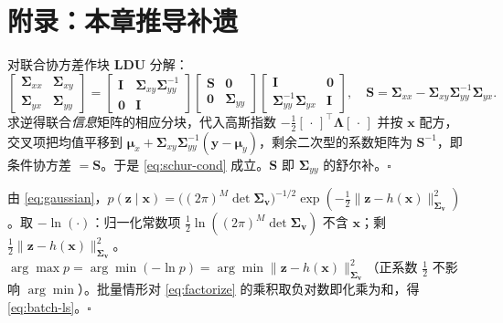\section*{附录：本章推导补遗}
\label{sec:est-appendix}

\begin{derivation}
对联合协方差作块 $\mathbf{LDU}$ 分解：
\[
  \begin{bmatrix}\boldsymbol{\Sigma}_{xx}&\boldsymbol{\Sigma}_{xy}\\\boldsymbol{\Sigma}_{yx}&\boldsymbol{\Sigma}_{yy}\end{bmatrix}
  =\begin{bmatrix}\mathbf{I}&\boldsymbol{\Sigma}_{xy}\boldsymbol{\Sigma}_{yy}^{-1}\\\mathbf{0}&\mathbf{I}\end{bmatrix}
   \begin{bmatrix}\mathbf{S}&\mathbf{0}\\\mathbf{0}&\boldsymbol{\Sigma}_{yy}\end{bmatrix}
   \begin{bmatrix}\mathbf{I}&\mathbf{0}\\\boldsymbol{\Sigma}_{yy}^{-1}\boldsymbol{\Sigma}_{yx}&\mathbf{I}\end{bmatrix},
  \quad \mathbf{S}=\boldsymbol{\Sigma}_{xx}-\boldsymbol{\Sigma}_{xy}\boldsymbol{\Sigma}_{yy}^{-1}\boldsymbol{\Sigma}_{yx}.
\]
求逆得联合\emph{信息}矩阵的相应分块，代入高斯指数 $-\tfrac12[\,\cdot\,]^\top\boldsymbol{\Lambda}[\,\cdot\,]$ 并按 $\mathbf{x}$ 配方，交叉项把均值平移到 $\boldsymbol{\mu}_x+\boldsymbol{\Sigma}_{xy}\boldsymbol{\Sigma}_{yy}^{-1}(\mathbf{y}-\boldsymbol{\mu}_y)$，剩余二次型的系数矩阵为 $\mathbf{S}^{-1}$，即条件协方差 $=\mathbf{S}$。于是 \cref{eq:schur-cond} 成立。$\mathbf{S}$ 即 $\boldsymbol{\Sigma}_{yy}$ 的舒尔补。\hfill$\square$
\end{derivation}

\begin{derivation}
由 \cref{eq:gaussian}，$p(\mathbf{z}\mid\mathbf{x})=\big((2\pi)^M\det\boldsymbol{\Sigma}_{\mathbf{v}}\big)^{-1/2}\exp(-\tfrac12\|\mathbf{z}-h(\mathbf{x})\|_{\boldsymbol{\Sigma}_{\mathbf{v}}}^2)$。取 $-\ln(\cdot)$：归一化常数项 $\tfrac12\ln((2\pi)^M\det\boldsymbol{\Sigma}_{\mathbf{v}})$ 不含 $\mathbf{x}$；剩 $\tfrac12\|\mathbf{z}-h(\mathbf{x})\|_{\boldsymbol{\Sigma}_{\mathbf{v}}}^2$。$\arg\max p=\arg\min(-\ln p)=\arg\min\|\mathbf{z}-h(\mathbf{x})\|_{\boldsymbol{\Sigma}_{\mathbf{v}}}^2$（正系数 $\tfrac12$ 不影响 $\arg\min$）。批量情形对 \cref{eq:factorize} 的乘积取负对数即化乘为和，得 \cref{eq:batch-ls}。\hfill$\square$
\end{derivation}

